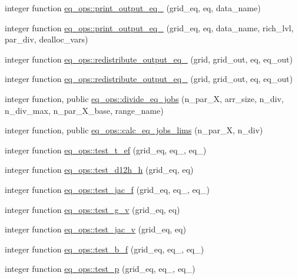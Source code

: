 \begin{DoxyCompactItemize}
\item 
integer function \hyperlink{namespaceeq__ops_ad7c123990ab1ff23dbd71bb47c3181b8}{eq\+\_\+ops\+::print\+\_\+output\+\_\+eq\+\_} (grid\+\_\+eq, eq, data\+\_\+name)
\item 
integer function \hyperlink{namespaceeq__ops_a479e914bb96e5269af860cae149e1a73}{eq\+\_\+ops\+::print\+\_\+output\+\_\+eq\+\_} (grid\+\_\+eq, eq, data\+\_\+name, rich\+\_\+lvl, par\+\_\+div, dealloc\+\_\+vars)
\item 
integer function \hyperlink{namespaceeq__ops_adc3d3173255a02f750a4d2c0f1b30044}{eq\+\_\+ops\+::redistribute\+\_\+output\+\_\+eq\+\_} (grid, grid\+\_\+out, eq, eq\+\_\+out)
\item 
integer function \hyperlink{namespaceeq__ops_a34003959915249394273824108af61e0}{eq\+\_\+ops\+::redistribute\+\_\+output\+\_\+eq\+\_} (grid, grid\+\_\+out, eq, eq\+\_\+out)
\item 
integer function, public \hyperlink{namespaceeq__ops_a8fae749abe55865d8135fef536a8e8f1}{eq\+\_\+ops\+::divide\+\_\+eq\+\_\+jobs} (n\+\_\+par\+\_\+X, arr\+\_\+size, n\+\_\+div, n\+\_\+div\+\_\+max, n\+\_\+par\+\_\+\+X\+\_\+base, range\+\_\+name)
\item 
integer function, public \hyperlink{namespaceeq__ops_a4e20b8725fce149449f83754244dc84e}{eq\+\_\+ops\+::calc\+\_\+eq\+\_\+jobs\+\_\+lims} (n\+\_\+par\+\_\+X, n\+\_\+div)
\item 
integer function \hyperlink{namespaceeq__ops_a1f5049c3e309fa23ee46fd116c9344f1}{eq\+\_\+ops\+::test\+\_\+t\+\_\+ef} (grid\+\_\+eq, eq\+\_, eq\+\_)
\item 
integer function \hyperlink{namespaceeq__ops_a003df1e1ab90dc6f586c3eed3dd067e8}{eq\+\_\+ops\+::test\+\_\+d12h\+\_\+h} (grid\+\_\+eq, eq)
\item 
integer function \hyperlink{namespaceeq__ops_a05dcd4803b9c7845d3353614c9630c23}{eq\+\_\+ops\+::test\+\_\+jac\+\_\+f} (grid\+\_\+eq, eq\+\_, eq\+\_)
\item 
integer function \hyperlink{namespaceeq__ops_a9811c83477d9d85f7401fd7957a590fc}{eq\+\_\+ops\+::test\+\_\+g\+\_\+v} (grid\+\_\+eq, eq)
\item 
integer function \hyperlink{namespaceeq__ops_aef40d04e93f6a96576f8fe893fb086f8}{eq\+\_\+ops\+::test\+\_\+jac\+\_\+v} (grid\+\_\+eq, eq)
\item 
integer function \hyperlink{namespaceeq__ops_a8082c12510696bd8ffdd0deef41860c2}{eq\+\_\+ops\+::test\+\_\+b\+\_\+f} (grid\+\_\+eq, eq\+\_, eq\+\_)
\item 
integer function \hyperlink{namespaceeq__ops_a38b723f6ed5d2e2772c9c3ad14d5ffd4}{eq\+\_\+ops\+::test\+\_\+p} (grid\+\_\+eq, eq\+\_, eq\+\_)
\end{DoxyCompactItemize}
